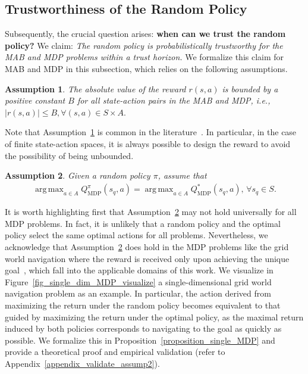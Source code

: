 \documentclass[10pt]{article}
\DeclareMathOperator*{\argmax}{arg\,max}
\newtheorem{assumption}{Assumption}
\begin{document}
\subsection{Trustworthiness of the Random Policy}
Subsequently, the crucial question arises: \textbf{when can we trust the random policy?}
We claim: \textit{The random policy is probabilistically trustworthy for the MAB and MDP problems within a trust horizon.}
We formalize this claim for MAB and MDP in this subsection, which relies on the following assumptions.
\begin{assumption}\label{assumption_bound_reward}
   The absolute value of the reward $r(s, a)$ is bounded by a positive constant $B$ for all state-action pairs in the MAB and MDP, i.e., $|r(s, a)| \leq B, \forall (s, a) \in S \times A.$
\end{assumption}
Note that Assumption~\ref{assumption_bound_reward} is common in the literature~\citep{azar2017minimax, wei2020model, zhang2021near}.
In particular, in the case of finite state-action spaces, it is always possible to design the reward to avoid the possibility of being unbounded.
\begin{assumption}\label{assumption_mdp_equal}
    Given a random policy $\pi$, assume that
    \begin{align}
        \argmax_{ a \in A} Q_\text{MDP}^\pi(s_q, a) = \argmax_{a \in A} Q_\text{MDP}^*(s_q, a), \, \forall s_q \in S.
    \end{align}
\end{assumption}
It is worth highlighting first that Assumption~\ref{assumption_mdp_equal} may not hold universally for all MDP problems. In fact, it is unlikely that a random policy and the optimal policy select the same optimal actions for all problems. Nevertheless, we acknowledge that Assumption~\ref{assumption_mdp_equal} does hold in the MDP problems like the grid world navigation where the reward is received only upon achieving the unique goal~\citep{laskin2022context, lee2024supervised, dong2024context}, which fall into the applicable domains of this work. We visualize in Figure~\ref{fig_single_dim_MDP_visualize} a single-dimensional grid world navigation problem as an example. In particular, the action derived from maximizing the return under the random policy becomes equivalent to that guided by maximizing the return under the optimal policy, as the maximal return induced by both policies corresponds to navigating to the goal as quickly as possible. We formalize this in Proposition~\ref{proposition_single_MDP} and provide a theoretical proof and empirical validation (refer to Appendix~\ref{appendix_validate_assump2}).
\end{document}
